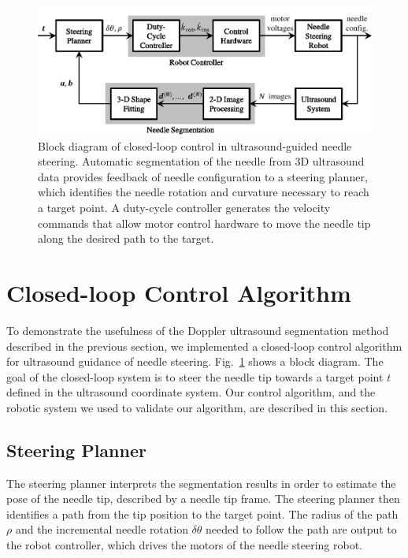 \begin{figure}[!t]
\centering
\includegraphics[width=0.85\columnwidth]{Images/Chapter2/ControlBlockDiagram/ControlBlockDiagram}%
\caption[Block diagram of closed-loop control algorithm]{Block diagram of closed-loop control in ultrasound-guided needle steering. Automatic segmentation of the needle from 3D ultrasound data provides feedback of needle configuration to a steering planner, which identifies the needle rotation and curvature necessary to reach a target point. A duty-cycle controller generates the velocity commands that allow motor control hardware to move the needle tip along the desired path to the target.}
\label{fig:ControlBlockDiagram}
\end{figure}

\section{Closed-loop Control Algorithm}
To demonstrate the usefulness of the Doppler ultrasound segmentation method described in the previous section, we implemented a closed-loop control algorithm for ultrasound guidance of needle steering. Fig.~\ref{fig:ControlBlockDiagram} shows a block diagram. The goal of the closed-loop system is to steer the needle tip towards a target point ${t}$ defined in the ultrasound coordinate system. Our control algorithm, and the robotic system we used to validate our algorithm, are described in this section. 

\subsection{Steering Planner}
The steering planner interprets the segmentation results in order to estimate the pose of the needle tip, described by a needle tip frame. The steering planner then identifies a path from the tip position to the target point. The radius of the path $\rho$ and the incremental needle rotation $\delta\theta$ needed to follow the path are output to the robot controller, which drives the motors of the needle steering robot.

